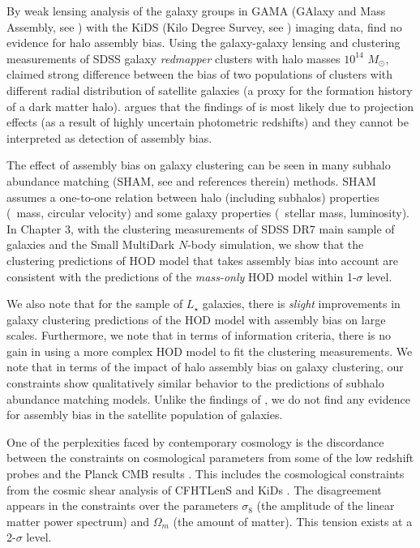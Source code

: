 By weak lensing analysis of the galaxy groups in GAMA (GAlaxy and Mass Assembly, see \citealt{driver}) 
with the KiDS (Kilo Degree Survey, see \citealt{kuijken2015}) imaging data, \citet{dvornik2017} find no evidence for halo assembly bias.
Using the galaxy-galaxy lensing and clustering measurements of SDSS galaxy \emph{redmapper} clusters \citep{rykoff} with halo masses $10^{14}$ $M_{\odot}$, 
\citet{miyatake2016} claimed strong difference between the bias of two populations of clusters with different radial distribution of satellite galaxies 
(a proxy for the formation history of a dark matter halo). \citet{zuetal2016} argues that the findings of \citet{miyatake2016} is most likely due to projection effects (as a result of highly uncertain photometric redshifts) and they cannot be interpreted as detection of assembly bias. 

The effect of assembly bias on galaxy clustering can be seen in many subhalo abundance matching (SHAM, see \citealt{hearin2014,lehman2015} and references therein) methods. SHAM assumes a one-to-one relation between halo (including subhalos) properties (\eg\ mass, circular velocity) and some galaxy properties (\eg\ stellar mass, luminosity). In Chapter 3, with the clustering measurements of SDSS DR7 main sample of galaxies \citep{abazajian2009} and the Small MultiDark $N$-body simulation, we show that the clustering predictions of \citep{decorated} HOD model that takes assembly bias into account are consistent with the predictions of the \emph{mass-only} HOD model within 1-$\sigma$ level. 

We also note that for the sample of $L_{\star}$ galaxies, there is \emph{slight} improvements in galaxy clustering predictions of the HOD model with assembly bias 
on large scales. Furthermore, we note that in terms of information criteria, there is no gain in using a more complex HOD model to fit the clustering measurements.
We note that in terms of the impact of halo assembly bias on galaxy clustering, our constraints show qualitatively similar behavior to the predictions of subhalo abundance matching models. Unlike the findings of \citet{zentner2016}, we do not find any evidence for assembly bias in the satellite population of galaxies.

One of the perplexities faced by contemporary cosmology is the discordance between the constraints on cosmological parameters from some of the low redshift probes and 
the Planck CMB results \citep{planckII}. This includes the cosmological constraints from the cosmic shear analysis of CFHTLenS \citep{heymans,kitching2016} and KiDs \citep{hildebrandt2017}. The disagreement appears in the constraints over the parameters $\sigma_{8}$ (the amplitude of the linear matter power spectrum) and $\Omega_{m}$ (the amount of matter). This tension exists at a 2-$\sigma$ level. 

